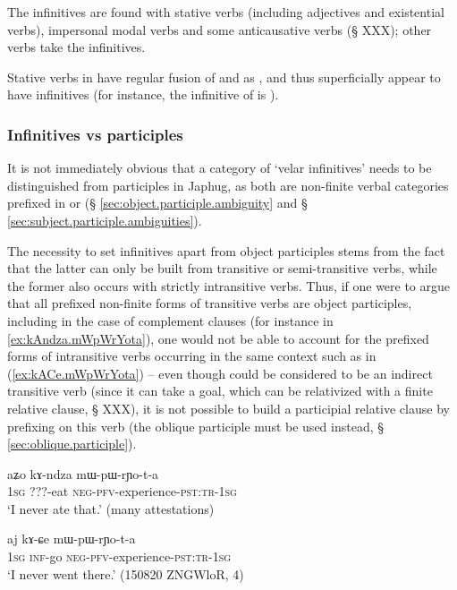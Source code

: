 The  infinitives are found with stative verbs (including adjectives and existential verbs), impersonal modal verbs and some anticausative verbs (§ XXX); other verbs take the  infinitives. 

Stative verbs in  have regular fusion of  and  as , and thus superficially appear to have  infinitives (for instance, the infinitive of  is  ).

\subsubsection{Infinitives vs participles} \label{sec:infinitives.participles}
It is not immediately obvious that a category of `velar infinitives' needs to be distinguished from participles in Japhug, as both are non-finite verbal categories prefixed in  or  (§ \ref{sec:object.participle.ambiguity} and § \ref{sec:subject.participle.ambiguities}). 

The necessity to set  infinitives apart from object participles stems from the fact that the latter can only be built from transitive or semi-transitive verbs, while the former also occurs with strictly intransitive verbs. Thus, if one were to argue that all prefixed non-finite forms of transitive verbs are object participles, including in the case of complement clauses (for instance  in \ref{ex:kAndza.mWpWrYota}), one would not be able to account for the prefixed forms of intransitive verbs occurring in the same context such as  in (\ref{ex:kACe.mWpWrYota}) -- even though  could be considered to be an indirect transitive verb (since it can take a goal, which can be relativized with a finite relative clause, § XXX), it is not possible to build a participial relative clause by prefixing  on this verb (the oblique participle  must be used instead, § \ref{sec:oblique.participle}).

\begin{exe}
\ex \label{ex:kAndza.mWpWrYota}
\gll aʑo kɤ-ndza mɯ-pɯ-rɲo-t-a \\
\textsc{1sg} ???-eat \textsc{neg}-\textsc{pfv}-experience-\textsc{pst}:\textsc{tr}-\textsc{1sg} \\
\glt `I never ate that.' (many attestations)
\end{exe}

\begin{exe}
\ex \label{ex:kACe.mWpWrYota}
\gll  aj kɤ-ɕe mɯ-pɯ-rɲo-t-a \\
\textsc{1sg} \textsc{inf}-go \textsc{neg}-\textsc{pfv}-experience-\textsc{pst}:\textsc{tr}-\textsc{1sg}  \\
\glt `I never went there.' (150820 ZNGWloR, 4)
\end{exe}

